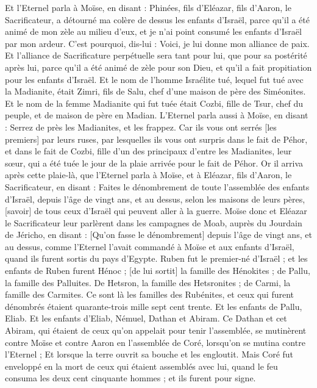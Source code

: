\begin{multicols}{2}
Et l'Eternel parla à Moïse, en disant :
Phinées, fils d'Eléazar, fils d'Aaron, le Sacrificateur, a détourné ma colère de dessus les enfants d'Israël, parce qu'il a été animé de mon zèle au milieu d'eux, et je n'ai point consumé les enfants d'Israël par mon ardeur.
C'est pourquoi, dis-lui : Voici, je lui donne mon alliance de paix.
Et l'alliance de Sacrificature perpétuelle sera tant pour lui, que pour sa postérité après lui, parce qu'il a été animé de zèle pour son Dieu, et qu'il a fait propitiation pour les enfants d'Israël.
Et le nom de l'homme Israélite tué, lequel fut tué avec la Madianite, était Zimri, fils de Salu, chef d'une maison de père des Siméonites.
Et le nom de la femme Madianite qui fut tuée était Cozbi, fille de Tsur, chef du peuple, et de maison de père en Madian.
L'Eternel parla aussi à Moïse, en disant :
Serrez de près les Madianites, et les frappez.
Car ils vous ont serrés [les premiers] par leurs ruses, par lesquelles ils vous ont surpris dans le fait de Péhor, et dans le fait de Cozbi, fille d'un des principaux d'entre les Madianites, leur sœur, qui a été tuée le jour de la plaie arrivée pour le fait de Péhor.
\VerseOne{}Or il arriva après cette plaie-là, que l'Eternel parla à Moïse, et à Eléazar, fils d'Aaron, le Sacrificateur, en disant :
Faites le dénombrement de toute l'assemblée des enfants d'Israël, depuis l'âge de vingt ans, et au dessus, selon les maisons de leurs pères, [savoir] de tous ceux d'Israël qui peuvent aller à la guerre.
Moïse donc et Eléazar le Sacrificateur leur parlèrent dans les campagnes de Moab, auprès du Jourdain de Jéricho, en disant :
[Qu'on fasse le dénombrement] depuis l'âge de vingt ans, et au dessus, comme l'Eternel l'avait commandé à Moïse et aux enfants d'Israël, quand ils furent sortis du pays d'Egypte.
Ruben fut le premier-né d'Israël ; et les enfants de Ruben furent Hénoc ; [de lui sortit] la famille des Hénokites ; de Pallu, la famille des Palluites.
De Hetsron, la famille des Hetsronites ; de Carmi, la famille des Carmites.
Ce sont là les familles des Rubénites, et ceux qui furent dénombrés étaient quarante-trois mille sept cent trente.
Et les enfants de Pallu, Eliab.
Et les enfants d'Eliab, Némuel, Dathan et Abiram. Ce Dathan et cet Abiram, qui étaient de ceux qu'on appelait pour tenir l'assemblée, se mutinèrent contre Moïse et contre Aaron en l'assemblée de Coré, lorsqu'on se mutina contre l'Eternel ;
Et lorsque la terre ouvrit sa bouche et les engloutit. Mais Coré fut enveloppé en la mort de ceux qui étaient assemblés avec lui, quand le feu consuma les deux cent cinquante hommes ; et ils furent pour signe.

\end{multicols}
